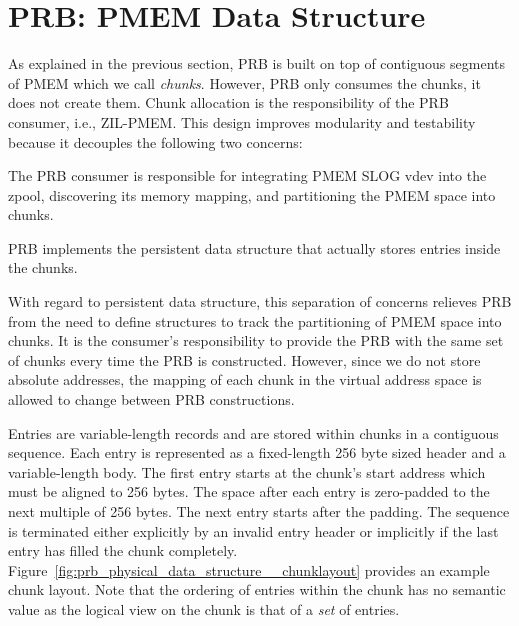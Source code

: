 \documentclass[12pt,a4paper,twoside]{book}
\begin{document}
\section{PRB: PMEM Data Structure}\label{di:prb:pmemdatastructure}
As explained in the previous section, PRB is built on top of contiguous segments of PMEM which we call \textit{chunks}.
However, PRB only consumes the chunks, it does not create them.
Chunk allocation is the responsibility of the PRB consumer, i.e., ZIL-PMEM.
This design improves modularity and testability because it decouples the following two concerns:
\begin{description}[noitemsep,leftmargin=1.5cm,labelindent=1cm]
    \item[Resource Acquisition] The PRB consumer is responsible for integrating PMEM SLOG vdev into the zpool, discovering its memory mapping, and partitioning the PMEM space into chunks.
    \item[PMEM Data Structure] PRB implements the persistent data structure that actually stores entries inside the chunks.
\end{description}
With regard to persistent data structure, this separation of concerns relieves PRB from the need to define structures to track the partitioning of PMEM space into chunks.
It is the consumer's responsibility to provide the PRB with the same set of chunks every time the PRB is constructed.
However, since we do not store absolute addresses, the mapping of each chunk in the virtual address space is allowed to change between PRB constructions.


Entries are variable-length records and are stored within chunks in a contiguous sequence.
Each entry is represented as a fixed-length 256 byte sized header and a variable-length body.
The first entry starts at the chunk's start address which must be aligned to 256 bytes.
The space after each entry is zero-padded to the next multiple of 256 bytes.
The next entry starts after the padding.
The sequence is terminated either explicitly by an invalid entry header or implicitly if the last entry has filled the chunk completely.
Figure~\ref{fig:prb_physical_data_structure__chunklayout} provides an example chunk layout.
Note that the ordering of entries within the chunk has no semantic value as the logical view on the chunk is that of a \textit{set} of entries.
\end{document}
